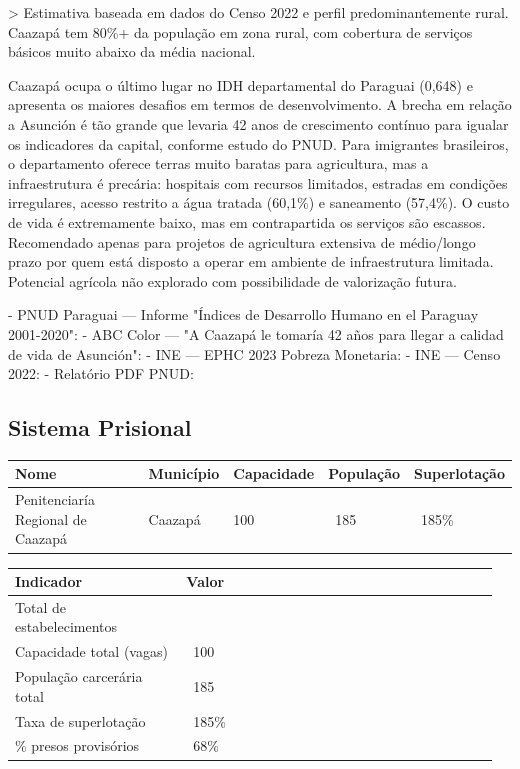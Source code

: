 > Estimativa baseada em dados do Censo 2022 e perfil predominantemente rural. Caazapá tem 80\%+ da população em zona rural, com cobertura de serviços básicos muito abaixo da média nacional.


Caazapá ocupa o último lugar no IDH departamental do Paraguai (0,648) e apresenta os maiores desafios em termos de desenvolvimento. A brecha em relação a Asunción é tão grande que levaria 42 anos de crescimento contínuo para igualar os indicadores da capital, conforme estudo do PNUD. Para imigrantes brasileiros, o departamento oferece terras muito baratas para agricultura, mas a infraestrutura é precária: hospitais com recursos limitados, estradas em condições irregulares, acesso restrito a água tratada (60,1\%) e saneamento (57,4\%). O custo de vida é extremamente baixo, mas em contrapartida os serviços são escassos. Recomendado apenas para projetos de agricultura extensiva de médio/longo prazo por quem está disposto a operar em ambiente de infraestrutura limitada. Potencial agrícola não explorado com possibilidade de valorização futura.


- PNUD Paraguai --- Informe "Índices de Desarrollo Humano en el Paraguay 2001-2020": 
- ABC Color --- "A Caazapá le tomaría 42 años para llegar a calidad de vida de Asunción": 
- INE --- EPHC 2023 Pobreza Monetaria: 
- INE --- Censo 2022: 
- Relatório PDF PNUD: 


\subsection{Sistema Prisional}



{\small
\setlength{\tabcolsep}{3pt}
\renewcommand{\arraystretch}{1.12}
{\small
\begin{tabularx}{\linewidth}{lXXXX}
\toprule
Nome & Município & Capacidade & População & Superlotação \\
\midrule
Penitenciaría Regional de Caazapá & Caazapá & 100 & ~185 & ~185\% \\
\bottomrule
\end{tabularx}
}
}


{\small
\setlength{\tabcolsep}{3pt}
\renewcommand{\arraystretch}{1.12}
\begin{tabularx}{\linewidth}{>{\raggedright\arraybackslash}p{0.34\linewidth} >{\raggedright\arraybackslash}p{0.62\linewidth}}
\toprule
Indicador & Valor \\
\midrule
Total de estabelecimentos & 1 \\
Capacidade total (vagas) & ~100 \\
População carcerária total & ~185 \\
Taxa de superlotação & ~185\% \\
\% presos provisórios & ~68\% \\
\bottomrule
\end{tabularx}
}


